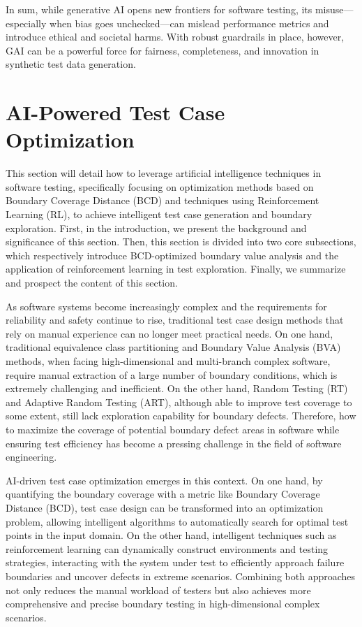 \documentclass[manuscript,screen,review]{acmart}
\begin{document}
In sum, while generative AI opens new frontiers for software testing, its misuse---especially when bias goes unchecked---can mislead performance metrics and introduce ethical and societal harms. With robust guardrails in place, however, GAI can be a powerful force for fairness, completeness, and innovation in synthetic test data generation.




\section{AI-Powered Test Case Optimization}
\label{sec:3}

This section will detail how to leverage artificial intelligence techniques in software testing, specifically focusing on optimization methods based on Boundary Coverage Distance (BCD) and techniques using Reinforcement Learning (RL), to achieve intelligent test case generation and boundary exploration. First, in the introduction, we present the background and significance of this section. Then, this section is divided into two core subsections, which respectively introduce BCD-optimized boundary value analysis and the application of reinforcement learning in test exploration. Finally, we summarize and prospect the content of this section.

As software systems become increasingly complex and the requirements for reliability and safety continue to rise, traditional test case design methods that rely on manual experience can no longer meet practical needs. On one hand, traditional equivalence class partitioning and Boundary Value Analysis (BVA) methods, when facing high-dimensional and multi-branch complex software, require manual extraction of a large number of boundary conditions, which is extremely challenging and inefficient. On the other hand, Random Testing (RT) and Adaptive Random Testing (ART), although able to improve test coverage to some extent, still lack exploration capability for boundary defects. Therefore, how to maximize the coverage of potential boundary defect areas in software while ensuring test efficiency has become a pressing challenge in the field of software engineering.

AI-driven test case optimization emerges in this context. On one hand, by quantifying the boundary coverage with a metric like Boundary Coverage Distance (BCD), test case design can be transformed into an optimization problem, allowing intelligent algorithms to automatically search for optimal test points in the input domain. On the other hand, intelligent techniques such as reinforcement learning can dynamically construct environments and testing strategies, interacting with the system under test to efficiently approach failure boundaries and uncover defects in extreme scenarios. Combining both approaches not only reduces the manual workload of testers but also achieves more comprehensive and precise boundary testing in high-dimensional complex scenarios.
\end{document}
